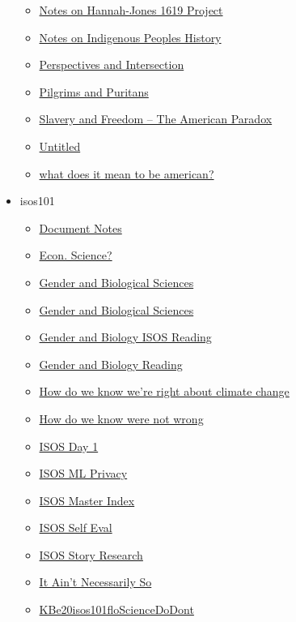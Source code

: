 \documentclass[11pt]{article}
\begin{document}
\begin{itemize}
\begin{itemize}
\item \href{hist301/KBxNotesonHannahJones.org}{Notes on Hannah-Jones 1619 Project}
\item \href{hist301/KBxIndigenousPeoplesHistoftheUSNotes.org}{Notes on Indigenous Peoples History}
\item \href{hist301/KBhHIST301IndianPersp.org}{Perspectives and Intersection}
\item \href{hist301/KBdPilgrimsPuritans.org}{Pilgrims and Puritans}
\item \href{hist301/KBxSlaveryandFreedomTheAmericanParadox.org}{Slavery and Freedom -- The American Paradox}
\item \href{hist301/Untitled.org}{Untitled}
\item \href{hist301/KBxWhatDoesItMeanToBeAmerican.org}{what does it mean to be american?}
\end{itemize}
\item isos101
\begin{itemize}
\item \href{isos101/KB20200828003106.org}{Document Notes}
\item \href{isos101/KBIsEconScience.org}{Econ. Science?}
\item \href{isos101/KBhISOS101GenderandBio.org}{Gender and Biological Sciences}
\item \href{isos101/KB20200912233524.org}{Gender and Biological Sciences}
\item \href{isos101/KBGenderAndBioISOS.org}{Gender and Biology ISOS Reading}
\item \href{isos101/KBdGenderAndBio.org}{Gender and Biology Reading}
\item \href{isos101/KBAreWeRight.org}{How do we know we're right about climate change}
\item \href{isos101/KBdwkwnwISOSNotes.org}{How do we know were not wrong}
\item \href{isos101/KBhISOS101D1.org}{ISOS Day 1}
\item \href{isos101/KBxISOSMLPrivacy.org}{ISOS ML Privacy}
\item \href{isos101/KBISOSMasterIndex.org}{ISOS Master Index}
\item \href{isos101/KBxIsosSE.org}{ISOS Self Eval}
\item \href{isos101/KBhISOS101StoryResearch.org}{ISOS Story Research}
\item \href{isos101/KBAintNesSoNotes.org}{It Ain't Necessarily So}
\item \href{isos101/KBe20isos101floScienceDoDont.org}{KBe20isos101floScienceDoDont}

\end{itemize}
\end{itemize}
\end{document}

